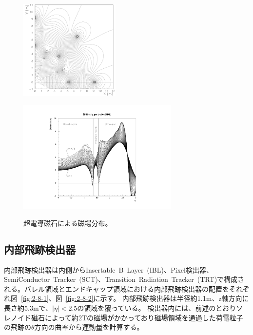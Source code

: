\begin{figure}[h]
  \begin{minipage}[b]{0.45\linewidth}
      \centering
      \includegraphics[clip, width=5cm]{fig/2/FMBmap.pdf}
      \label{fig:2-7-1}
  \end{minipage}
    \begin{minipage}[b]{0.48\linewidth}
      \centering
      \includegraphics[clip, width=8cm]{fig/2/bdl.pdf}
      \label{fig:2-7-2}
  \end{minipage}
  \caption{超電導磁石による磁場分布\cite{article:ATLASMagneticField}。}
\end{figure}

\subsection{内部飛跡検出器}\label{2-2-3}
内部飛跡検出器は内側からInsertable~B~Layer~(IBL)、Pixel検出器、SemiConductor~Tracker~(SCT)、Transition~Radiation~Tracker~(TRT)で構成される。バレル領域とエンドキャップ領域における内部飛跡検出器の配置をそれぞれ図~\ref{fig:2-8-1}、図~\ref{fig:2-8-2}に示す。
内部飛跡検出器は半径約1.1m、z軸方向に長さ約5.3mで、$|\eta|<2.5$の領域を覆っている。
検出器内には、前述のとおりソレノイド磁石によって約2Tの磁場がかかっており磁場領域を通過した荷電粒子の飛跡の$\theta$方向の曲率から運動量を計算する。

